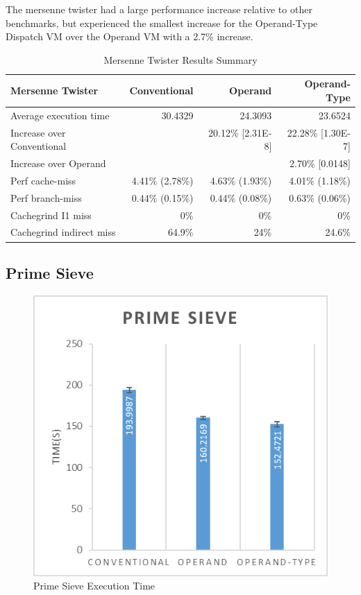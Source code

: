 \documentclass[english,a4paper,12pt]{report}
\begin{document}
The mersenne twister had a large performance increase relative to
other benchmarks, but experienced the smallest increase for the
Operand-Type Dispatch VM over the Operand VM with a 2.7\% increase.

\begin{table}[!htb]
  \begin{center}
    \begin{tabular}{lrrr}
      Mersenne Twister & Conventional & Operand & Operand-Type\\
      \hline
      Average execution time & 30.4329 & 24.3093 & 23.6524\\
      Increase over Conventional &  & 20.12\% [2.31E-8] & 22.28\% [1.30E-7]\\
      Increase over Operand &  &  & 2.70\% [0.0148]\\
      Perf cache-miss & 4.41\% (2.78\%) & 4.63\% (1.93\%) & 4.01\% (1.18\%)\\
      Perf branch-miss & 0.44\% (0.15\%) & 0.44\% (0.08\%) & 0.63\% (0.06\%)\\
      Cachegrind I1 miss & 0\% & 0\% & 0\%\\
      Cachegrind indirect miss & 64.9\% & 24\% & 24.6\%\\
    \end{tabular}
  \end{center}
  \caption{Mersenne Twister Results Summary}
\end{table}
\newpage
\subsection{Prime Sieve}

\begin{figure}[!htb]
  \centering
  \includegraphics{primesieve.png}
  \caption{Prime Sieve Execution Time}
  \label{fig:primesieve-time}
\end{figure}
\end{document}
